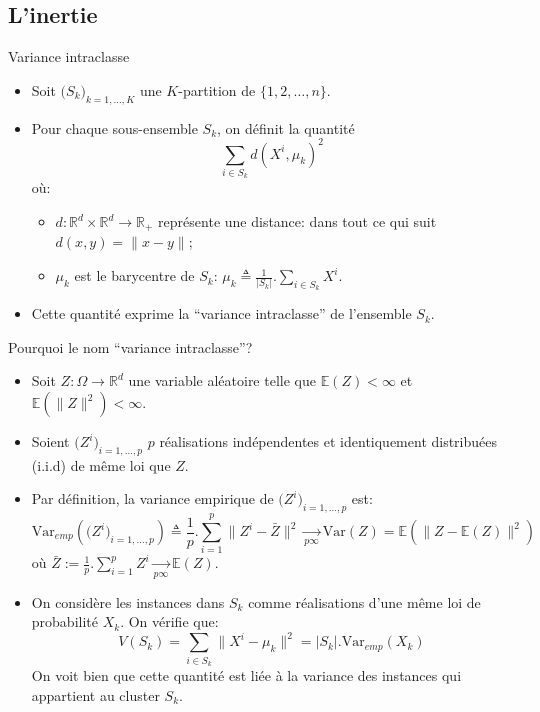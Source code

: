 \documentclass[8pt]{beamer}
\begin{document}
		\subsection{L'inertie}
			\begin{frame}{Variance intraclasse}
				\begin{itemize}
					\item<1-> Soit \(\big(S_k\big)_{k = 1, \dots, K}\) une \(K\)-partition de \(\{1, 2, \dots, n\}\).
					\item<2-> Pour chaque sous-ensemble \(S_k\), on définit la quantité
						\begin{equation}
							\sum_{i\in S_k} d(X^i, \mu_k)^2
						\end{equation}
					 où:
						\begin{itemize}
							\item<3-> \(d: \mathbb{R}^d \times \mathbb{R}^d \rightarrow \mathbb{R}_+\) représente une distance: dans tout ce qui suit \(d(x, y) = \lVert x - y \rVert\);
							\item<3-> \(\mu_k\) est le barycentre de \(S_k\): \( \mu_k \triangleq \frac{1}{\vert S_k \vert}.\sum_{i\in S_k} X^i\).
						\end{itemize}
					\item<4-> Cette quantité exprime la ``variance intraclasse'' de l'ensemble \(S_k\).
				\end{itemize}
			\end{frame}
			\begin{frame}{Pourquoi le nom ``variance intraclasse''?}
				\begin{itemize}
					\item<1-> Soit \(Z: \Omega \rightarrow \mathbb{R}^d\) une variable aléatoire telle que \(\mathbb{E}(Z) < \infty\) et \(\mathbb{E}(\lVert Z \rVert^2) < \infty\).
					\item<2-> Soient \(\big(Z^i\big)_{i=1,\dots,p}\) \(p\) réalisations indépendentes et identiquement distribuées (i.i.d) de même loi que \(Z\).
					\item<3-> Par définition, la variance empirique de \(\big(Z^i\big)_{i=1,\dots,p}\) est:
						\begin{equation}
							\text{Var}_{emp}(\big(Z^i\big)_{i=1,\dots,p}) \triangleq \frac{1}{p} . \sum_{i=1}^{p} \lVert Z^i - \bar Z \rVert^2 \underset{p\infty}{\longrightarrow} \text{Var}(Z) = \mathbb{E}(\lVert Z - \mathbb{E}(Z) \rVert^2)
						\end{equation}
						où \(\bar Z := \frac{1}{p}.\sum_{i=1}^{p} Z^i \underset{p\infty}{\longrightarrow} \mathbb{E}(Z)\).
					\item<4-> On considère les instances dans \(S_k\) comme réalisations d'une même loi de probabilité \(X_k\). On vérifie que:
						\begin{equation}
							V(S_k) = \sum_{i\in S_k} \lVert X^i - \mu_k \rVert^2 = \vert S_k \vert . \text{Var}_{emp}(X_k)
						\end{equation}
						On voit bien que cette quantité est liée à la variance des instances qui appartient au cluster \(S_k\).
				\end{itemize}
			\end{frame}
\end{document}
